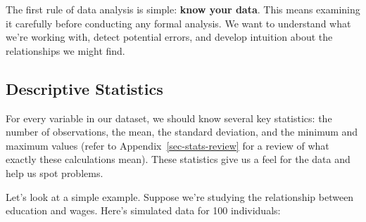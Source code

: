 \documentclass[
  letterpaper,
  DIV=11,
  numbers=noendperiod]{scrreprt}
\begin{document}
The first rule of data analysis is simple: \textbf{know your data}. This
means examining it carefully before conducting any formal analysis. We
want to understand what we're working with, detect potential errors, and
develop intuition about the relationships we might find.

\subsection{Descriptive Statistics}\label{descriptive-statistics}

For every variable in our dataset, we should know several key
statistics: the number of observations, the mean, the standard
deviation, and the minimum and maximum values (refer to
Appendix~\ref{sec-stats-review} for a review of what exactly these
calculations mean). These statistics give us a feel for the data and
help us spot problems.

Let's look at a simple example. Suppose we're studying the relationship
between education and wages. Here's simulated data for 100 individuals:
\end{document}
